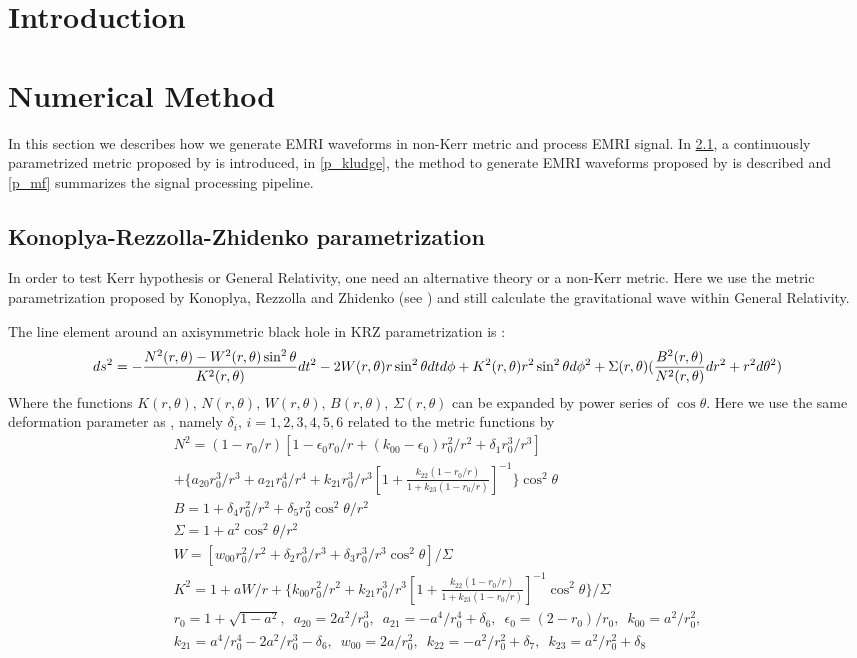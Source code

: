 \documentclass{article}
\begin{document}
\section{Introduction}
\section{Numerical Method}
In this section we describes how we generate EMRI waveforms in non-Kerr metric and process EMRI signal. In \ref{p_krz}, a continuously parametrized metric proposed by \cite{KRZ} is introduced, in \ref{p_kludge}, the method to generate EMRI waveforms proposed by \cite{kludge} is described and \ref{p_mf} summarizes the signal processing pipeline.
\subsection{Konoplya-Rezzolla-Zhidenko parametrization}
\label{p_krz}
In order to test Kerr hypothesis or General Relativity, one need an alternative theory or a non-Kerr metric. Here we use the metric parametrization proposed by Konoplya, Rezzolla and Zhidenko (see \cite{KRZ}) and still calculate the gravitational wave within General Relativity. 

The line element around an axisymmetric black hole in KRZ parametrization is \cite{KRZ}:
\begin{equation}
	ds^2=-\frac{N^2(r,\theta)-W^2(r,\theta)\sin^2\theta}{K^2(r,\theta)} dt^2-2W(r,\theta)r\sin^2\theta dtd\phi + K^2(r,\theta) r^2\sin^2\theta d\phi^2 \\ +\Sigma(r,\theta)(\frac{B^2(r,\theta)}{N^2(r,\theta)} dr^2+r^2d\theta^2)
\end{equation}
Where the functions $K(r,\theta),\, N(r,\theta),\, W(r,\theta),\, B(r,\theta),\, \Sigma(r,\theta) $ can be expanded by power series of $\cos\theta$. Here we use the same deformation parameter as \cite{cosimoKRZ}, namely $\delta_i, \, i=1,2,3,4,5,6$ related to the metric functions by
\begin{equation}
\begin{aligned}
N^2=(1-r_0/r)[ 1-\epsilon_0r_0/r +(k_{00}-\epsilon_0)r_0^2/r^2 +\delta_1 r_0^3/r^3 ] \\
+ \{ a_{20} r_0^3/r^3 +a_{21} r_0^4/r^4 + k_{21}r_0^3/r^3[ 1+\frac{k_{22}(1-r_0/r) }{1+k_{23}(1-r_0/r)} ]^{-1}   \} \cos^2\theta   \\
B=1+\delta_4r_0^2 /r^2 +\delta_5r_0^2 \cos^2\theta /r^2\\
\Sigma = 1+a^2\cos^2\theta /r^2\\
W=[w_{00}r_0^2 /r^2 +\delta_2 r_0^3/r^3 +\delta_3 r_0^3/r^3 \cos^2\theta ]/\Sigma\\
K^2= 1+aW/r+\{k_{00}r_0^2/r^2 +k_{21}r_0^3/r^3 [ 1+\frac{k_{22}(1-r_0/r) }{1+k_{23}(1-r_0/r)} ]^{-1} \cos^2\theta \}/\Sigma\\
r_0=1+\sqrt{1-a^2},\,\,\, a_{20}=2a^2/r_0^3,\,\,\, a_{21}=-a^4/r_0^4 +\delta_6 ,\,\,\, \epsilon_0=(2-r_0)/r_0,\,\,\, k_{00}=a^2/r_0^2,\\
 k_{21}=a^4/r_0^4 -2a^2/r_0^3-\delta_6,\,\,\, w_{00}=2a/r_0^2,\,\,\, k_{22}=-a^2/r_0^2 +\delta_7,\,\,\,  k_{23} = a^2/r_0^2 +\delta_8
\end{aligned}
\end{equation}
\end{document}
